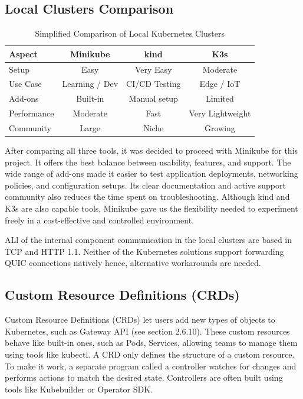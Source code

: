 \subsection{Local Clusters Comparison}
\begin{table}[h]
\centering
\begin{tabular}{|l|c|c|c|}
\hline
\textbf{Aspect} & \textbf{Minikube} & \textbf{kind} & \textbf{K3s} \\
\hline
Setup & Easy & Very Easy & Moderate \\
Use Case & Learning / Dev & CI/CD Testing & Edge / IoT \\
Add-ons & Built-in & Manual setup & Limited \\
Performance & Moderate & Fast & Very Lightweight \\
Community & Large & Niche & Growing \\
\hline
\end{tabular}
\caption{Simplified Comparison of Local Kubernetes Clusters}
\end{table}


After comparing all three tools, it was decided to proceed with Minikube for this project. It offers the best balance between usability, features, and support. The wide range of add-ons made it easier to test application deployments, networking policies, and configuration setups. Its clear documentation and active support community also reduces the time spent on troubleshooting. Although kind and K3s are also capable tools, Minikube gave us the flexibility needed to experiment freely in a cost-effective and controlled environment.

ALl of the internal component communication in the local clusters are based in TCP and HTTP 1.1. Neither of the Kubernetes solutions support forwarding QUIC connections natively hence, alternative workarounds are needed.

\subsection{Custom Resource Definitions (CRDs)}
Custom Resource Definitions (CRDs) let users add new types of objects to Kubernetes, such as Gateway API (see section 2.6.10). These custom resources behave like built-in ones, such as Pods, Services, allowing teams to manage them using tools like kubectl. A CRD only defines the structure of a custom resource. To make it work, a separate program called a controller watches for changes and performs actions to match the desired state. Controllers are often built using tools like Kubebuilder or Operator SDK.

